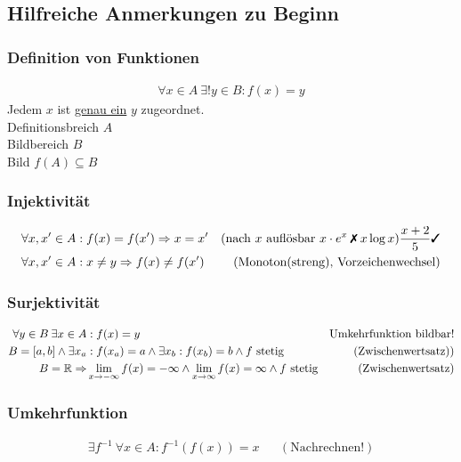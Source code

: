 \subsection{Hilfreiche Anmerkungen zu Beginn}
\subsubsection{Definition von Funktionen}
\begin{align*}
    \forall x \in A \: \exists! y \in B: f(x) = y
\end{align*}
Jedem $x$ ist \underline{genau ein} $y$ zugeordnet. \\
Definitionsbreich $A$\\
Bildbereich $B$\\
Bild $f(A) \subseteq B$

\subsubsection{Injektivität}
\begin{align*}
    \forall x, x' \in A&: f(x) = f(x') \Rightarrow x = x' & \text{(nach } x \text{ auflösbar } x\cdot e^x \: \xmark\: x\log x) \frac{x+2}{5} \cmark\\
    \forall x, x' \in A&: x \neq y \Rightarrow f(x) \neq f(x') & \text{(Monoton(streng), Vorzeichenwechsel)}\\
\end{align*}

\subsubsection{Surjektivität}
\begin{align*}
    \forall y \in B \: \exists x \in A&: f(x) = y & \text{Umkehrfunktion bildbar!}\\
    B = [a, b] \land \exists x_a&: f(x_a) = a \land \exists x_b: f(x_b) = b \land f \text{ stetig} & (\text{Zwischenwertsatz)})\\
    B = \mathbb R \Rightarrow&\lim_{x \rightarrow - \infty} f(x) = - \infty \land \lim_{x \rightarrow \infty} f(x) = \infty \land f \text{ stetig} & \text{(Zwischenwertsatz)}
\end{align*}

\subsubsection{Umkehrfunktion}
\begin{align*}
    \exists f^{-1} \: \forall x \in A: f^{-1} (f(x)) = x && (\text{Nachrechnen!})
\end{align*}

